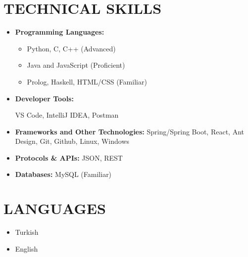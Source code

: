 \begin{minipage}[t]{0.8\textwidth}
  \section{TECHNICAL SKILLS}
    \begin{multicols}{2}
      \begin{itemize}[leftmargin=0.25in, itemsep=1pt]
        \item \textbf{Programming Languages:} 
          \begin{itemize}[label={-}, leftmargin=0.2in]
            \item Python, C, C++ (Advanced)
            \item Java and JavaScript (Proficient)
            \item Prolog, Haskell, HTML/CSS (Familiar)
          \end{itemize}
        \vspace*{\fill}

        \item \textbf{Developer Tools:} 
          
          VS Code, IntelliJ IDEA, Postman

        \item \textbf{Frameworks and Other Technologies:} 
          Spring/Spring Boot, React, Ant Design, Git, Github, Linux, Windows
        
        \item \textbf{Protocols \& APIs:} 
          JSON, REST

        \item \textbf{Databases:} 
          MySQL (Familiar)
      \end{itemize}
    \end{multicols}
\end{minipage}
\begin{minipage}[t]{0.18\textwidth}
  \section{LANGUAGES}
  \begin{itemize}[leftmargin=0.25in, itemsep=1pt]
    \item Turkish
    \item English
  \end{itemize}
\end{minipage}